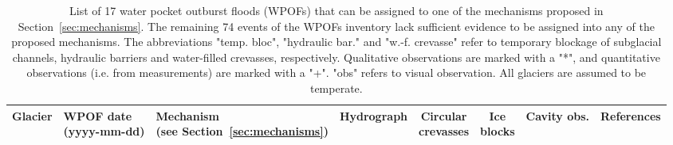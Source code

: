 \begin{sidewaystable}
    \centering
    \caption{List of 17 water pocket outburst floods (WPOFs) that can be assigned to one of the mechanisms proposed in Section~\ref{sec:mechanisms}. The remaining 74 events of the WPOFs inventory lack sufficient evidence to be assigned into any of the proposed mechanisms. The abbreviations "temp. bloc", "hydraulic bar." and "w.-f. crevasse" refer to temporary blockage of subglacial channels, hydraulic barriers and water-filled crevasses, respectively. Qualitative observations are marked with a "*", and quantitative observations (i.e. from measurements) are marked with a "+". "obs" refers to visual observation. All glaciers are assumed to be temperate.}
    \label{tab:wpofs_mechanism}
    \begin{tabular}{l l l c c c l r}
        \hline
        \textbf{Glacier} & \makecell{\textbf{WPOF date} \\ (yyyy-mm-dd)} & \makecell{\textbf{Mechanism} \\ (see Section~\ref{sec:mechanisms})} & \textbf{Hydrograph} & \makecell{\textbf{Circular} \\ \textbf{crevasses}} & \makecell{\textbf{Ice} \\ \textbf{blocks}} & \textbf{Cavity obs.} & \textbf{References} \\
        \hline
        

\end{tabular}
\end{sidewaystable}

